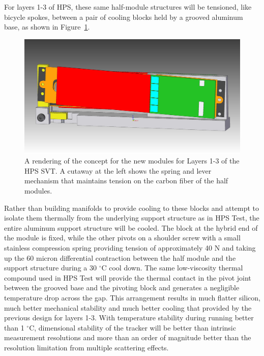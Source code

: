 For layers 1-3 of HPS, these same half-module structures will be tensioned, like bicycle spokes, between a pair of cooling blocks held by a grooved aluminum base, as shown in Figure~\ref{fig:newmodule_L1-3}. 
\begin{figure}[ht]
    \includegraphics[width=\textwidth]{svt/figures/10dec3.jpg}
\caption{\small{A rendering of the concept for the new modules for Layers 1-3 of the HPS SVT.  A cutaway at the left shows the spring and lever mechanism that maintains tension on the carbon fiber of the half modules.} }
\label{fig:newmodule_L1-3}
\end{figure}
Rather than building manifolds to provide cooling to these blocks and attempt to isolate them thermally from the underlying support structure as in HPS Test, the entire aluminum support structure will be cooled.  The block at the hybrid end of the module is fixed, while the other pivots on a shoulder screw with a small stainless compression spring providing tension of approximately 40 N and taking up the 60 micron differential contraction between the half module and the support structure during a 30 $^\circ$C cool down. The same low-viscosity thermal compound used in HPS Test will provide the thermal contact in the pivot joint between the grooved base and the pivoting block and generates a negligible temperature drop across the gap. This arrangement results in much flatter silicon, much better mechanical stability and much better cooling that provided by the previous design for layers 1-3. With temperature stability during running better than 1 $^\circ$C, dimensional stability of the tracker will be better than intrinsic measurement resolutions and more than an order of magnitude better than the resolution limitation from multiple scattering effects.

